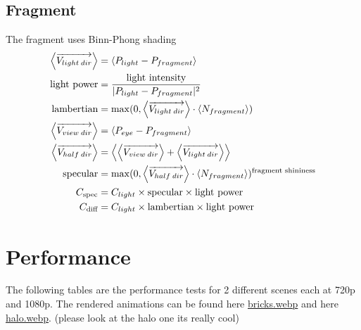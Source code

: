 \documentclass[12pt]{article}
\begin{document}
\subsection{Fragment}
The fragment uses Binn-Phong shading 
\begin{gather*}\begin{aligned}
		\left\langle \overrightarrow{V_{light\hspace{0.2em}dir}} \right\rangle
			&=
			\left\langle P_{light}-P_{fragment}\right\rangle \notag\\
		\text{light power} 
			&= 
			\frac{\text{light intensity}}{| P_{light}-P_{fragment}|^2}\\
		\text{lambertian} 
			&= \max(0, \left\langle 
			\overrightarrow{V_{light\hspace{0.2em}dir}} \right\rangle \cdot   \left\langle N_{fragment}\right\rangle) \\
		\left\langle\overrightarrow{V_{view\hspace{0.2em}dir}} \right\rangle 
		&= 
		\left\langle P_{eye}-P_{fragment}\right\rangle\\
		\left\langle\overrightarrow{V_{half\hspace{0.2em}dir}} \right\rangle 
		&= 
			\left\langle 
				\left\langle\overrightarrow{V_{view\hspace{0.2em}dir}} \right\rangle
				+
				\left\langle \overrightarrow{V_{light\hspace{0.2em}dir}}  \right\rangle
			\right\rangle \\
		\text{specular} &= \max(0, 
			\left\langle\overrightarrow{V_{half\hspace{0.2em}dir}} \right\rangle
			\cdot
			\left\langle N_{fragment}\right\rangle			
		)^{\text{fragment shininess}}\\
		C_{\text{spec}} &= C_{light}\times \text{specular} \times \text{light power}\\
		C_{\text{diff}} &= C_{light}\times \text{lambertian} \times \text{light power}
\end{aligned}\end{gather*}


\section{Performance}
The following tables are the performance tests for 2 different scenes each at 720p and 1080p. The rendered animations can be found here
\href{https://github.com/ParkerTenBroeck/3P93/blob/b09e7ca83aa0af8b57b7c728cc38519cd7d9188d/p2/code/examples/bricks.webp}{bricks.webp}
and here
\href{https://github.com/ParkerTenBroeck/3P93/blob/dff1995021a7f66e8c5a2a137551acbd2b20739f/p2/code/examples/halo.webp}{halo.webp}. (please look at the halo one its really cool)
\end{document}
